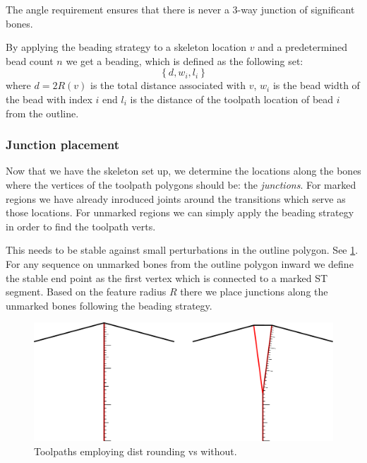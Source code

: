 The angle requirement ensures that there is never a 3-way junction of significant bones. 

By applying the beading strategy to a skeleton location $v$ and a predetermined bead count $n$ we get a beading, which is defined as the following set:
$$
\left\{ d, w_i, l_i  \right\}
$$
where
$d = 2 R(v)$ is the total distance associated with $v$,
$w_i$ is the bead width of the bead with index $i$
end
$l_i$ is the distance of the toolpath location of bead $i$ from the outline.



\subsubsection{Junction placement}

Now that we have the skeleton set up, we determine the locations along the bones where the vertices of the toolpath polygons should be: the \emph{junctions}.
For marked regions we have already inroduced joints around the transitions which serve as those locations.
For unmarked regions we can simply apply the beading strategy in order to find the toolpath verts.


This needs to be stable against small perturbations in the outline polygon.
See \cref{heterogeneous_joint_generation}.
For any sequence on unmarked bones from the outline polygon inward we define the stable end point as the first vertex which is connected to a marked ST segment.
Based on the feature radius $R$ there we place junctions along the unmarked bones following the beading strategy.

\begin{figure}
\includegraphics[width=\columnwidth]{sources/method/heterogeneous_joint_generation.pdf}
\caption{Toolpaths employing dist rounding vs without.}
\label{heterogeneous_joint_generation}
\end{figure}





